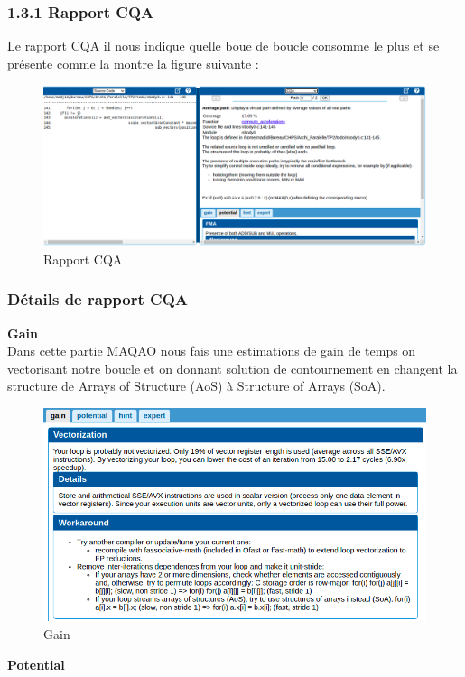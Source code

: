 \documentclass[11pt,a4paper,onecolumn,openright,oneside]{report}
\begin{document}
\subsubsection{1.3.1 Rapport CQA}
Le rapport CQA il nous indique quelle boue de boucle consomme le plus et se présente comme la montre la figure suivante :
\begin{figure}[H]
    \centering
    \includegraphics[scale=0.37]{Images/1/CQA.png}
    \caption{Rapport CQA}
    \label{fig:my_label}
\end{figure}
\newpage
\subsubsection{Détails de rapport CQA}
\textbf{Gain}\\

Dans cette partie MAQAO nous fais une estimations de gain de temps on vectorisant notre boucle et on donnant solution de contournement en changent la structure de Arrays of Structure (AoS) à Structure of Arrays (SoA).
\begin{figure}[H]
    \centering
    \includegraphics[scale=0.5]{Images/1/gain.png}
    \caption{Gain}
    \label{fig:my_label}
\end{figure}
\textbf{Potential}\\
\end{document}
